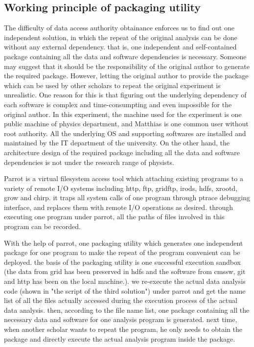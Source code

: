 \documentclass{acm_proc_article-sp}
\begin{document}
\subsection{Working principle of packaging utility}
The difficulty of data access authority obtainance enforces us to find out one independent solution, in which the repeat of the original analysis can be done without any external dependency. that is, one independent and self-contained package containing all the data and software dependencies is necessary. Someone may suggest that it should be the responsibility of the original author to generate the required package. However, letting the original author to provide the package which can be used by other scholars to repeat the original experiment is unrealistic. One reason for this is that figuring out the underlying dependency of each software is complex and time-consumpting and even impossible for the original author. In this experiment, the machine used for the experiment is one public machine of physics department, and Matthias is one common user without root authority. All the underlying OS and supporting softwares are installed and maintained by the IT department of the university. On the other hand, the architecture design of the required package including all the data and software dependencies is not under the research range of physists.

Parrot is a virtual filesystem access tool which attaching existing programs to a variety of remote I/O systems including http, ftp, gridftp, irods, hdfs, xrootd, grow and chirp. it traps all system calls of one program through ptrace debugging interface, and replaces them with remote I/O operations as desired. through executing one program under parrot, all the paths of files involved in this program can be recorded.

With the help of parrot, one packaging utility which generates one independent package for one program to make the repeat of the program convenient can be deployed. the basis of the packaging utility is one successful execution sandbox (the data from grid has been preserved in hdfs and the software from cmssw, git and http has been on the local machine.). we re-execute the actual data analysis code (shown in "the script of the third solution") under parrot and get the name list of all the files actually accessed during the execution process of the actual data analysis. then, according to the file name list, one package containing all the necessary data and software for one analysis program is generated. next time, when another scholar wants to repeat the program, he only needs to obtain the package and directly execute the actual analysis program inside the package.\\
\end{document}
